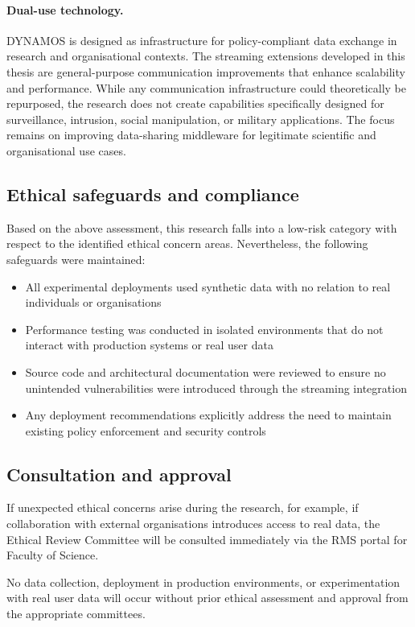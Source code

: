 \paragraph{Dual-use technology.}
DYNAMOS is designed as infrastructure for policy-compliant data exchange in research and organisational contexts. The streaming extensions developed in this thesis are general-purpose communication improvements that enhance scalability and performance. While any communication infrastructure could theoretically be repurposed, the research does not create capabilities specifically designed for surveillance, intrusion, social manipulation, or military applications. The focus remains on improving data-sharing middleware for legitimate scientific and organisational use cases.

\subsection{Ethical safeguards and compliance}

Based on the above assessment, this research falls into a low-risk category with respect to the identified ethical concern areas. Nevertheless, the following safeguards were maintained:

\begin{itemize}
  \item All experimental deployments used synthetic data with no relation to real individuals or organisations
  \item Performance testing was conducted in isolated environments that do not interact with production systems or real user data
  \item Source code and architectural documentation were reviewed to ensure no unintended vulnerabilities were introduced through the streaming integration
  \item Any deployment recommendations explicitly address the need to maintain existing policy enforcement and security controls
\end{itemize}

\subsection{Consultation and approval}

If unexpected ethical concerns arise during the research, for example, if collaboration with external organisations introduces access to real data, the Ethical Review Committee will be consulted immediately via the RMS portal for Faculty of Science.

No data collection, deployment in production environments, or experimentation with real user data will occur without prior ethical assessment and approval from the appropriate committees.
